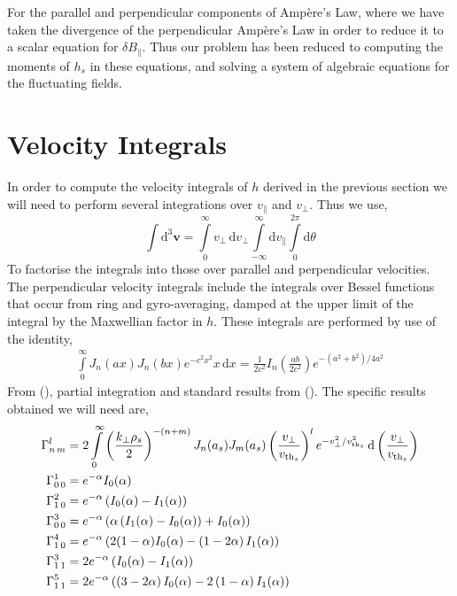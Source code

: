 \documentclass[prb,aps,amssymb,amsmath,a4paper]{revtex4}
\begin{document}
For the parallel and perpendicular components of Amp\`ere's Law, where we have taken the divergence of the perpendicular Amp\`ere's Law in order to reduce it to a scalar equation for $\delta B_\parallel$. Thus our problem has been reduced to computing the moments of $h_s$ in these equations, and solving a system of algebraic equations for the fluctuating fields.

\section{Velocity Integrals}
In order to compute the velocity integrals of $h$ derived in the previous section we will need to perform several integrations over $v_\parallel$ and $v_\perp$. Thus we use,
	\[
	\int \mathrm{d}^3\mathbf{v} = \int\limits_0^\infty v_\perp \,\mathrm{d}v_\perp \int\limits_{-\infty}^{\infty} \mathrm{d}v_\parallel \int\limits_0^{2\pi} \mathrm{d}\theta
	\]
	To factorise the integrals into those over parallel and perpendicular velocities. The perpendicular velocity integrals include the integrals over Bessel functions that occur from ring and gyro-averaging, damped at the upper limit of the integral by the Maxwellian factor in $h$. These integrals are performed by use of the identity,
	\begin{align}
	\int\limits_0^\infty J_n(a x)J_n(b x) e^{-c^2x^2} x \,\mathrm{d}x = \frac{1}{2c^2} I_n\left(\frac{ab}{2c^2}\right) e^{-\left(a^2+b^2\right)/4a^2} 
	\end{align}
	From (\cite{watson1966ttb}), partial integration and standard results from (\cite{gradshteuin1994tis}). The specific results obtained we will need are,
	\begin{align}
	\Gamma^{l}_{n\,m} &= 2 \int\limits_0^\infty \left(\frac{k_\perp \rho_s}{2}\right)^{-(n+m)} J_{n}(a_s)J_m(a_s) \left(\frac{v_\perp}{v_{\mathrm{th}_s}}\right)^l e^{-v_\perp^2/v_{\mathrm{th}_s}^2} \,\mathrm{d}\left(\frac{v_\perp}{v_{\mathrm{th}_s}}\right)
	\\
	\Gamma^{1}_{0\,0} &= e^{-\alpha}I_{0}(\alpha)
	\\
	\Gamma^{2}_{1\,0} &= e^{-\alpha} \left( I_0(\alpha)-I_1(\alpha)\right)
	\\
	\Gamma^{3}_{0\,0} &= e^{-\alpha}\left(\alpha\left(I_1(\alpha) - I_0(\alpha)\right) + I_0(\alpha)\right)
	\\
	\Gamma^{4}_{1\,0} &= e^{-\alpha} \left( 2(1-\alpha)I_0(\alpha) - \left(1 - 2\alpha\right)I_1(\alpha)\right)
	\\
	\Gamma^{3}_{1\,1} &= 2 e^{-\alpha} \left(I_0(\alpha) - I_1(\alpha) \right)
	\\
	\Gamma^{5}_{1\,1} &= 2 e^{-\alpha} \left( \left(3-2\alpha\right)I_0(\alpha) - 2\left(1-\alpha\right) I_1(\alpha)\right) 
\end{align}
\end{document}
